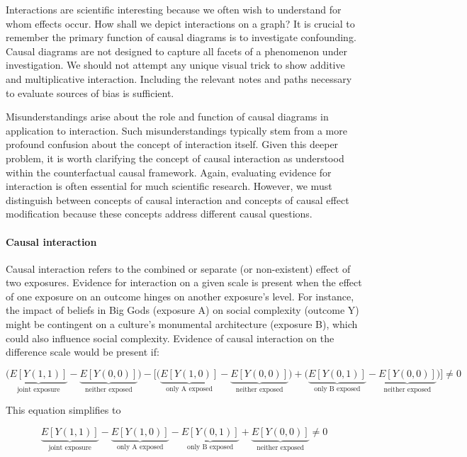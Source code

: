 \documentclass[
  singlecolumn]{article}
\let\oldparagraph\paragraph
\renewcommand{\paragraph}[1]{\oldparagraph{#1}\mbox{}}
\begin{document}
Interactions are scientific interesting because we often wish to
understand for whom effects occur. How shall we depict interactions on a
graph? It is crucial to remember the primary function of causal diagrams
is to investigate confounding. Causal diagrams are not designed to
capture all facets of a phenomenon under investigation. We should not
attempt any unique visual trick to show additive and multiplicative
interaction. Including the relevant notes and paths necessary to
evaluate sources of bias is sufficient.

Misunderstandings arise about the role and function of causal diagrams
in application to interaction. Such misunderstandings typically stem
from a more profound confusion about the concept of interaction itself.
Given this deeper problem, it is worth clarifying the concept of causal
interaction as understood within the counterfactual causal framework.
Again, evaluating evidence for interaction is often essential for much
scientific research. However, we must distinguish between concepts of
causal interaction and concepts of causal effect modification because
these concepts address different causal questions.

\hypertarget{causal-interaction}{%
\paragraph{\texorpdfstring{\textbf{Causal
interaction}}{Causal interaction}}\label{causal-interaction}}

Causal interaction refers to the combined or separate (or non-existent)
effect of two exposures. Evidence for interaction on a given scale is
present when the effect of one exposure on an outcome hinges on another
exposure's level. For instance, the impact of beliefs in Big Gods
(exposure A) on social complexity (outcome Y) might be contingent on a
culture's monumental architecture (exposure B), which could also
influence social complexity. Evidence of causal interaction on the
difference scale would be present if:

\[\bigg(\underbrace{E[Y(1,1)]}_{\text{joint exposure}} - \underbrace{E[Y(0,0)]}_{\text{neither exposed}}\bigg) - \bigg[ \bigg(\underbrace{E[Y(1,0)]}_{\text{only A exposed}} - \underbrace{E[Y(0,0)]}_{\text{neither exposed}}\bigg) + \bigg(\underbrace{E[Y(0,1)]}_{\text{only B exposed}} - \underbrace{E[Y(0,0)]}_{\text{neither exposed}} \bigg)\bigg] \neq 0 \]

This equation simplifies to

\[ \underbrace{E[Y(1,1)]}_{\text{joint exposure}} - \underbrace{E[Y(1,0)]}_{\text{only A exposed}} - \underbrace{E[Y(0,1)]}_{\text{only B exposed}} + \underbrace{E[Y(0,0)]}_{\text{neither exposed}} \neq 0 \]
\end{document}
